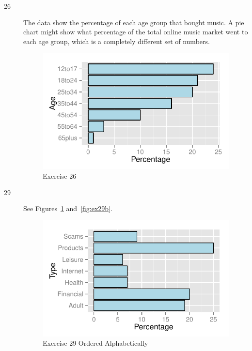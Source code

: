 \documentclass[letterpaper, landscape]{exam}
\begin{document}
\begin{description}
      \newpage

      \item[26]
        The data show the percentage of each age group that bought music.  A
        pie chart might show what percentage of the total online music market
        went to each age group, which is a completely different set of numbers.

        \begin{figure}[H]
          \centering
          \includegraphics{figures/ex26.pdf}
          \caption{Exercise 26}
        \end{figure}

      \item[29] See Figures~\ref{fig:ex29a} and~\ref{fig:ex29b}.

        \begin{figure}[H]
          \centering
          \includegraphics{figures/ex29a.pdf}
          \caption{Exercise 29 Ordered Alphabetically}\label{fig:ex29a}
        \end{figure}


\end{description}
\end{document}
